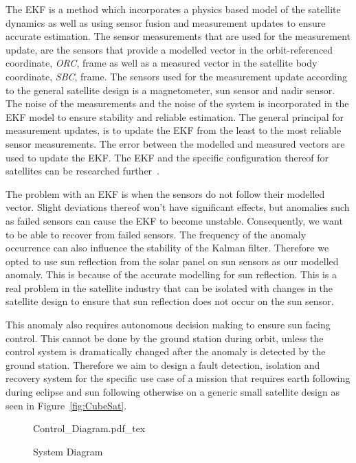 \documentclass[letterpaper, 10 pt, conference]{ieeeconf}  %
\begin{document}
The EKF is a method which incorporates a physics based model of the satellite dynamics as well as using sensor fusion and measurement updates to ensure accurate estimation. The sensor measurements that are used for the measurement update, are the sensors that provide a modelled vector in the orbit-referenced coordinate, \emph{ORC}, frame as well as a measured vector in the satellite body coordinate, \emph{SBC}, frame. The sensors used for the measurement update according to the general satellite design is a magnetometer, sun sensor and nadir sensor. The noise of the measurements and the noise of the system is incorporated in the EKF model to ensure stability and reliable estimation. The general principal for measurement updates, is to update the EKF from the least to the most reliable sensor measurements. The error between the modelled and measured vectors are used to update the EKF. The EKF and the specific configuration thereof for satellites can be researched further~\cite{JansevanVuuren2015}. 

The problem with an EKF is when the sensors do not follow their modelled vector. Slight deviations thereof won't have significant effects, but anomalies such as failed sensors can cause the EKF to become unstable. Consequently, we want to be able to recover from failed sensors. The frequency of the anomaly occurrence can also influence the stability of the Kalman filter. Therefore we opted to use sun reflection from the solar panel on sun sensors as our modelled anomaly. This is because of the accurate modelling for sun reflection. This is a real problem in the satellite industry that can be isolated with changes in the satellite design to ensure that sun reflection does not occur on the sun sensor.

This anomaly also requires autonomous decision making to ensure sun facing control. This cannot be done by the ground station during orbit, unless the control system is dramatically changed after the anomaly is detected by the ground station. Therefore we aim to design a fault detection, isolation and recovery system for the specific use case of a mission that requires earth following during eclipse and sun following otherwise on a generic small satellite design as seen in Figure~\ref{fig:CubeSat}.

\begin{figure*}[h!b!t]
	\centering
	\def\svgwidth{14cm}
	{Control_Diagram.pdf_tex}
	\caption{System Diagram}
	\label{fig:System_Diagram}
\end{figure*}
\end{document}
